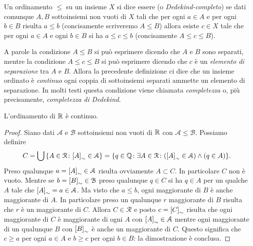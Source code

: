 \begin{definition}
  Un ordinamento $\le$ su un insieme $X$ si dice essere
  (o \emph{Dedekind-completo})
  se dati comunque $A,B$ sottoinsiemi non vuoti di $X$
    tali che per ogni $a\in A$ e per ogni $b\in B$ risulta $a\le b$
    (concisamente scriveremo $A\le B$)
    allora esiste $c\in X$ tale che per ogni $a\in A$ e ogni $b\in B$ 
    si ha $a\le c \le b$ (concisamente $A\le c \le B$).
\end{definition}
  
A parole la condizione $A\le B$ 
si può esprimere dicendo che $A$ e $B$ sono separati, 
mentre la condizione $A\le c \le B$ 
si può esprimere dicendo che $c$ è un \emph{elemento di separazione}
tra $A$ e $B$. 
Allora la precedente definizione ci dice che un insieme ordinato
è \emph{continuo} ogni coppia di sottoinsiemi separati 
ammette un elemento di separazione.
In molti testi questa condizione viene chiamata \emph{completezza}
o, più precisamente, \emph{completezza di Dedekind}.
%
%

\begin{theorem}  
L'ordinamento di ${\mathbb R}$ è continuo.
\end{theorem}
\begin{proof}
Siano dati $\mathcal A$ e $\mathcal B$ sottoinsiemi non vuoti di ${\mathbb R}$ 
con $\mathcal A\le \mathcal B$. 
Possiamo definire
\[
  C = \bigcup{\left\{ A\in \mathcal R\colon {\left[ A \right]}_\sim \in \mathcal A \right\}} 
    = {\left\{ q\in {\mathbb Q}\colon \exists A\in \mathcal R\colon 
    ({\left[ A \right]}_\sim \in \mathcal A) \land (q\in A) \right\}}.
\]
Preso qualunque $a={\left[ A \right]}_\sim \in \mathcal A$ risulta 
ovviamente $A\subset C$. In particolare $C$ non è vuoto.
Mentre se $b={\left[ B \right]}_\sim \in \mathcal B$ 
preso qualunque $q\in C$ si ha $q\in A$ per un qualche $A$ tale che 
${\left[ A \right]}_\sim = a\in \mathcal A$.
Ma visto che $a\le b$, ogni maggiorante di $B$ è anche maggiorante di $A$.
In particolare preso un qualunque $r$ maggiorante di $B$
risulta che $r$ è un maggiorante di $C$.
Allora $C\in \mathcal R$ e posto $c={\left[ C \right]}_\sim$ 
risulta che ogni maggiorante di $C$ è maggiorante di 
ogni $A$ con ${\left[ A \right]}_\sim \in \mathcal A$ mentre 
ogni maggiorante di un qualunque $B$ con ${\left[ B \right]}_\sim$ 
è anche un maggiorante di $C$.
Questo significa che $c\ge a$ per ogni $a\in A$ 
e $b\ge c$ per ogni $b\in B$: la dimostrazione è conclusa.
\end{proof}

